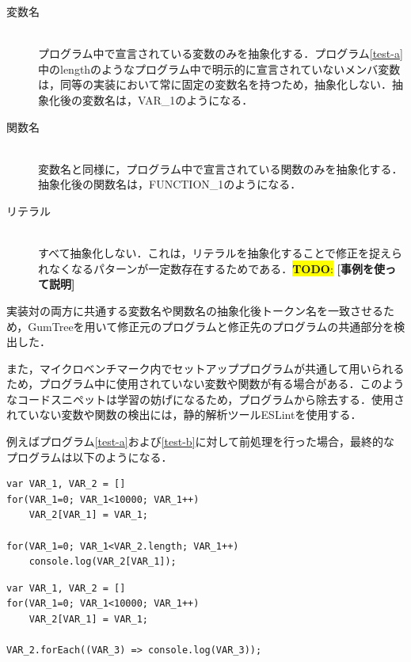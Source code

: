 \documentclass[T,J]{fose} %
\newcommand{\todo}[1]{\colorbox{yellow}{{\bf TODO}:}{\color{red} {\textbf{[#1]}}}}
\begin{document}
\begin{description}

\item[変数名]\mbox{}\\
プログラム中で宣言されている変数のみを抽象化する．プログラム\ref{test-a}中のlengthのようなプログラム中で明示的に宣言されていないメンバ変数は，同等の実装において常に固定の変数名を持つため，抽象化しない．抽象化後の変数名は，VAR\_1のようになる．

\item[関数名]\mbox{}\\
変数名と同様に，プログラム中で宣言されている関数のみを抽象化する．抽象化後の関数名は，FUNCTION\_1のようになる．

\item[リテラル]\mbox{}\\
すべて抽象化しない．これは，リテラルを抽象化することで修正を捉えられなくなるパターンが一定数存在するためである．\todo{事例を使って説明}

\end{description}


実装対の両方に共通する変数名や関数名の抽象化後トークン名を一致させるため，GumTree\cite{Falleri_2014}を用いて修正元のプログラムと修正先のプログラムの共通部分を検出した．

また，マイクロベンチマーク内でセットアッププログラムが共通して用いられるため，プログラム中に使用されていない変数や関数が有る場合がある．このようなコードスニペットは学習の妨げになるため，プログラムから除去する．使用されていない変数や関数の検出には，静的解析ツールESLintを使用する．

例えばプログラム\ref{test-a}および\ref{test-b}に対して前処理を行った場合，最終的なプログラムは以下のようになる．


\begin{lstlisting}[caption=Abstracted Program 1, label=abstract-a,captionpos=t]
var VAR_1, VAR_2 = []
for(VAR_1=0; VAR_1<10000; VAR_1++)
    VAR_2[VAR_1] = VAR_1;

for(VAR_1=0; VAR_1<VAR_2.length; VAR_1++)
    console.log(VAR_2[VAR_1]);
\end{lstlisting}

\begin{lstlisting}[caption=Abstracted Program 2, label=abstract-b,captionpos=t]
var VAR_1, VAR_2 = []
for(VAR_1=0; VAR_1<10000; VAR_1++)
    VAR_2[VAR_1] = VAR_1;

VAR_2.forEach((VAR_3) => console.log(VAR_3));
\end{lstlisting}
\end{document}
